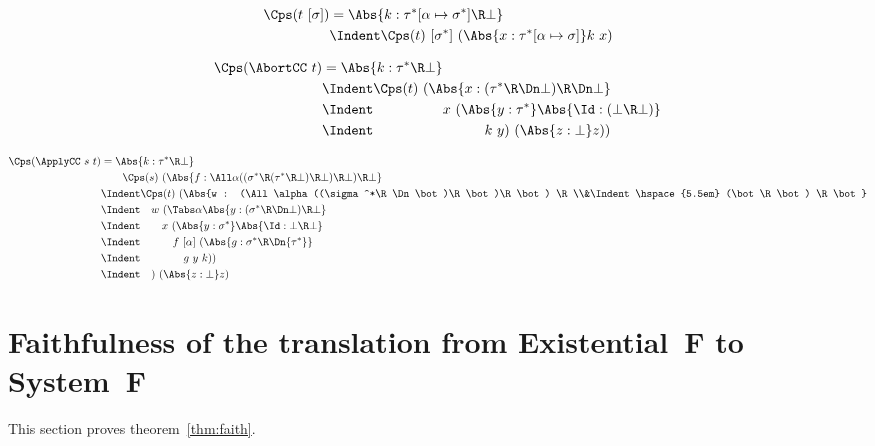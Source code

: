 \documentclass{amsart}
\begin{document}
\begin{align*}
\Cps(t~[\sigma])
& =
\Abs{k : \tau^*[\alpha\mapsto\sigma^*] \R \bot}
\\&\Indent
\Cps(t)~[\sigma^*]~(\Abs{x : \tau^*[\alpha\mapsto\sigma]} k~x)
\end{align*}

\begin{align*}
\Cps(\AbortCC~t)
& =
\Abs{k : \tau^*\R\bot}
\\&\Indent
\Cps(t)~(\Abs{x : (\tau^*\R\Dn\bot)\R\Dn\bot}
\\&\Indent\hspace{5em}
x~(\Abs{y : \tau^*} \Abs{\Id : (\bot\R\bot)}
\\&\Indent\hspace{8em}
k~y)~(\Abs{z : \bot}z))
\end{align*}

\begin{align*}
\Cps(\ApplyCC~s~t)
& =
\Abs{k : \tau^* \R \bot}
\\&\hspace{2em}
\Cps(s)~(\Abs{f : \All\alpha
  ((\sigma^*\R(\tau^*\R\bot)\R\bot)\R\bot)\R\bot}
\\&\Indent
\Cps(t)~(\Abs{w :
  (\All\alpha((\sigma^*\R \Dn\bot)\R\bot)\R\bot) \R
  \\&\Indent\hspace{5.5em}
  (\bot\R\bot) \R \bot}
\\&\Indent\hspace{1em}
w~(\Tabs\alpha \Abs{y :
  (\sigma^* \R \Dn\bot) \R \bot}
\\&\Indent\hspace{2em}
x~(\Abs{y : \sigma^*} \Abs{\Id : \bot \R \bot}
\\&\Indent\hspace{3em}
f~[\alpha]~(\Abs{g : \sigma^* \R \Dn{\tau^*}}
\\&\Indent\hspace{4em}
g~y~k))
\\&\Indent\hspace{1em}
)~(\Abs{z:\bot}z)
\end{align*}

\section{Faithfulness of the translation from Existential~F to
System~F}
\label{sec:faith}

This section proves theorem~\ref{thm:faith}.
\end{document}
